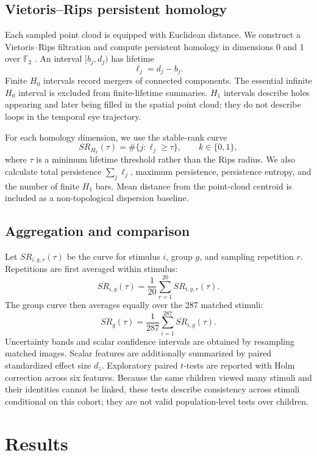 \documentclass[11pt,a4paper]{article}
\begin{document}
\subsection{Vietoris--Rips persistent homology}

Each sampled point cloud is equipped with Euclidean distance.  We construct a
Vietoris--Rips filtration and compute persistent homology in dimensions 0 and
1 over $\mathbb{F}_2$ \cite{edelsbrunner2010,ghrist2008}.  An interval
$[b_j,d_j)$ has lifetime
\[
\ell_j=d_j-b_j.
\]
Finite $H_0$ intervals record mergers of connected components.  The essential
infinite $H_0$ interval is excluded from finite-lifetime summaries.  $H_1$
intervals describe holes appearing and later being filled in the spatial point
cloud; they do not describe loops in the temporal eye trajectory.

For each homology dimension, we use the stable-rank curve
\[
SR_{H_k}(\tau)=\#\{j:\ell_j\geq\tau\},\qquad k\in\{0,1\},
\]
where $\tau$ is a minimum lifetime threshold rather than the Rips radius.  We
also calculate total persistence $\sum_j\ell_j$, maximum persistence,
persistence entropy, and the number of finite $H_1$ bars.  Mean distance from
the point-cloud centroid is included as a non-topological dispersion baseline.

\subsection{Aggregation and comparison}

Let $SR_{i,g,r}(\tau)$ be the curve for stimulus $i$, group $g$, and sampling
repetition $r$.  Repetitions are first averaged within stimulus:
\[
\overline{SR}_{i,g}(\tau)=\frac{1}{20}\sum_{r=1}^{20}SR_{i,g,r}(\tau).
\]
The group curve then averages equally over the 287 matched stimuli:
\[
\overline{SR}_{g}(\tau)=\frac{1}{287}\sum_{i=1}^{287}
\overline{SR}_{i,g}(\tau).
\]
Uncertainty bands and scalar confidence intervals are obtained by resampling
matched images.  Scalar features are additionally summarized by paired
standardized effect size $d_z$.  Exploratory paired $t$-tests are reported with
Holm correction across six features.  Because the same children viewed many
stimuli and their identities cannot be linked, these tests describe
consistency across stimuli conditional on this cohort; they are not valid
population-level tests over children.

\section{Results}
\end{document}
